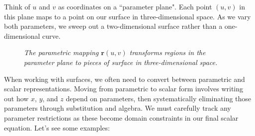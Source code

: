 \noindent Think of $u$ and $v$ as coordinates on a ``parameter plane". Each point $(u,v)$ in this plane maps to a point on our surface in three-dimensional space. As we vary both parameters, we sweep out a two-dimensional surface rather than a one-dimensional curve. \\

\begin{figure}[H]
\centering
{}
\caption{\textit{The parametric mapping $\mathbf{r}(u,v)$ transforms regions in the parameter plane to pieces of surface in three-dimensional space.}}
\label{fig:parameter_mapping}
\end{figure}

\noindent When working with surfaces, we often need to convert between parametric and scalar representations. Moving from parametric to scalar form involves writing out how $x$, $y$, and $z$ depend on parameters, then systematically eliminating those parameters through substitution and algebra. We must carefully track any parameter restrictions as these become domain constraints in our final scalar equation. Let's see some examples:


